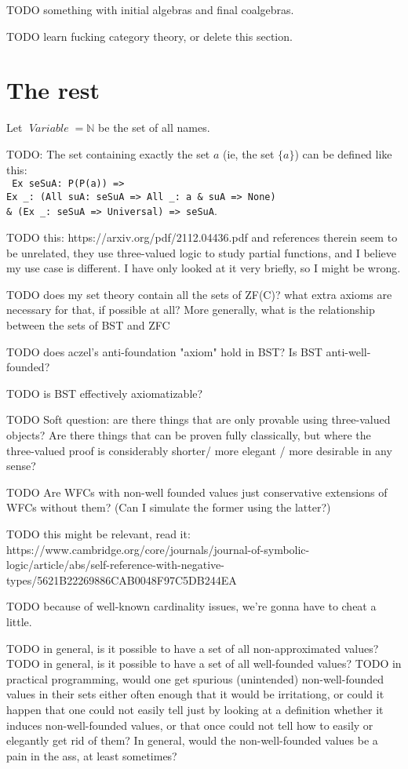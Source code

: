 \documentclass[oneside,12pt]{book}
\newcounter{question}
\theoremstyle{definition}
\theoremstyle{remark}
\newcommand{\tde}{\raisebox{0.5ex}{\texttildelow}}
\newcommand\var[1]{\mathop{\mathit{#1}}\nolimits}
\newcommand{\Variable}{\var{Variable}}
\begin{document}
TODO something with initial algebras and final coalgebras.

TODO learn fucking category theory, or delete this section.

\section{The rest}

\begin{defBox}
  Let $\Variable = \mathbb{N}$ be the set of all names.
\end{defBox}

TODO: The set containing exactly the set $a$ (ie, the set $\{ a \}$) can be defined
like this: \\ \texttt{%
  Ex seSuA: P(P(a)) => \\ \phantom{a}
  Ex \_: (All suA: seSuA => All \_: a \& \tde suA => None) \\ \phantom{aaa}
  \& (Ex \_: seSuA => Universal) => seSuA}.

TODO this:
https://arxiv.org/pdf/2112.04436.pdf
and references therein seem to be unrelated, they use three-valued logic
to study partial functions, and I believe my use case is different.
I have only looked at it very briefly, so I might be wrong.

TODO does my set theory contain all the sets of ZF(C)? what extra axioms
are necessary for that, if possible at all? More generally, what is the
relationship between the sets of BST and ZFC

TODO does aczel's anti-foundation "axiom" hold in BST? Is BST anti-well-founded?

TODO is BST effectively axiomatizable?

TODO Soft question: are there things that are only provable using three-valued
objects? Are there things that can be proven fully classically, but where
the three-valued proof is considerably shorter/ more elegant / more desirable
in any sense?

TODO Are WFCs with non-well founded values just conservative extensions of WFCs without them? (Can I simulate the former using the latter?)

TODO this might be relevant, read it:
https://www.cambridge.org/core/journals/journal-of-symbolic-logic/article/abs/self-reference-with-negative-types/5621B22269886CAB0048F97C5DB244EA

TODO because of well-known cardinality issues, we're gonna have to cheat a little.

TODO in general, is it possible to have a set of all non-approximated values?
TODO in general, is it possible to have a set of all well-founded values?
TODO in practical programming, would one get spurious (unintended) non-well-founded
values in their sets either often enough that it would be irritationg, or
could it happen that one could not easily tell just by looking at a definition whether
it induces non-well-founded values, or that once could not tell how to easily or
elegantly get rid of them? In general, would the non-well-founded values be
a pain in the ass, at least sometimes?
\end{document}

